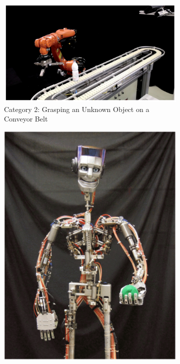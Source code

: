 \begin{figure}
\begin{subfigure}{.4\linewidth}
        \label{fig:ConvBelt}
    \end{subfigure}
    \begin{subfigure}{.5\linewidth}
        \centering
        \includegraphics[width=.8\textwidth]{Images/ConveyorUnknown.png}
       \caption[Category 2: Grasping an Unknown Object on a Conveyor Belt]{Category 2: Grasping an Unknown Object on a Conveyor Belt \cite{ConveyorUnknownObject}}
        \label{fig:MilkConvy}
    \end{subfigure}
    \begin{subfigure}{.4\linewidth}
        \centering
        \includegraphics[width=.8\textwidth]{Images/Disney.png}

\end{subfigure}
\end{figure}
